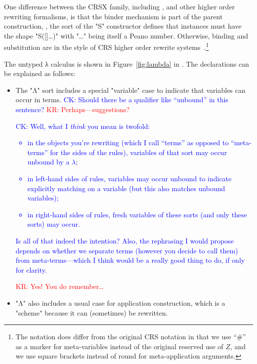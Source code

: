 \documentclass[letterpaper,11pt]{article}
\newcommand{\CK}[1]{\textcolor{blue}{CK: #1}}
\newcommand{\KR}[1]{\textcolor{red}{KR: #1}}
\begin{document}
\begin{remark}
  One difference between the CRSX family, including \hax, and other higher order rewriting
  formalisms, is that the binder mechanism is part of the parent construction, \eg, the sort of the
  "S" constructor defines that instances must have the shape "S([]…)" with "…" being itself a Peano
  number.  Otherwise, binding and substitution are in the style of CRS higher order rewrite
  systems~\cite{Klop+:tcs1993}.\footnote{The notation does differ from the original CRS notation in
    that we use ``\#'' as a marker for meta-variables instead of the original reserved use of $Z$,
    and we use square brackets instead of round for meta-application arguments.}
\end{remark}

\begin{example}\label{ex:lambda}
  The untyped λ calculus is shown in Figure~\ref{fig:lambda} in \hax.  The declarations can be
  explained as follows:
  \begin{itemize}

  \item The "Λ" sort includes a special "variable" case to indicate that variables can occur in
    terms. \CK{Should there be a qualifier like ``unbound'' in this sentence?}
    \KR{Perhaps---suggestions?} \CK{Well, what I \emph{think} you mean is twofold:
    \begin{itemize}
    \item in the objects you're rewriting (which I call ``terms'' as opposed to ``meta-terms''
      for the sides of the rules), variables of that sort may occur unbound by a $\lambda$;
    \item in left-hand sides of rules, variables may occur unbound to indicate explicitly
      matching on a variable (but this also matches unbound variables);
    \item in right-hand sides of rules, fresh variables of these sorts (and only these
      sorts) may occur.
    \end{itemize}
    Is all of that indeed the intention?  Also, the rephrasing I would propose depends on whether we
    separate terms (however you decide to call them) from meta-terms---which I think would be a
    really good thing to do, if only for clarity.} \KR{Yes! You do remember…}

  \item "Λ" also includes a usual case for application construction, which is a "scheme" because it
    can (sometimes) be rewritten.


\end{itemize}
\end{example}
\end{document}

